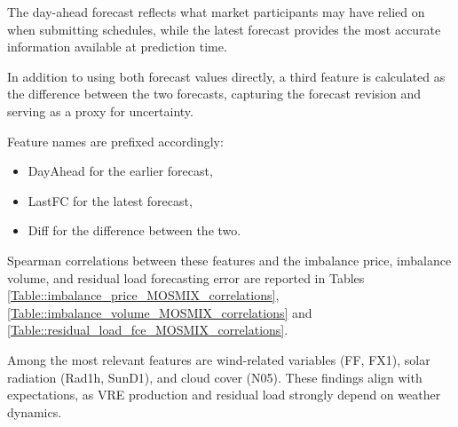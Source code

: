 \documentclass[class=scrbook, crop=false]{standalone}
\begin{document}
The day-ahead forecast reflects what market participants may have relied on when submitting schedules, while the latest forecast provides the most accurate information available at prediction time.

In addition to using both forecast values directly, a third feature is calculated as the difference between the two forecasts, capturing the forecast revision and serving as a proxy for uncertainty.

Feature names are prefixed accordingly:
\begin{itemize}
\item DayAhead for the earlier forecast,
\item LastFC for the latest forecast,
\item Diff  for the difference between the two.
\end{itemize}
Spearman correlations between these features and the imbalance price, imbalance volume, and residual load forecasting error are reported in Tables \ref{Table::imbalance_price_MOSMIX_correlations},  \ref{Table::imbalance_volume_MOSMIX_correlations} and  \ref{Table::residual_load_fce_MOSMIX_correlations}.

Among the most relevant features are wind-related variables (FF, FX1), solar radiation (Rad1h, SunD1), and cloud cover (N05). These findings align with expectations, as VRE production and residual load strongly depend on weather dynamics.




    
    
\end{document}
